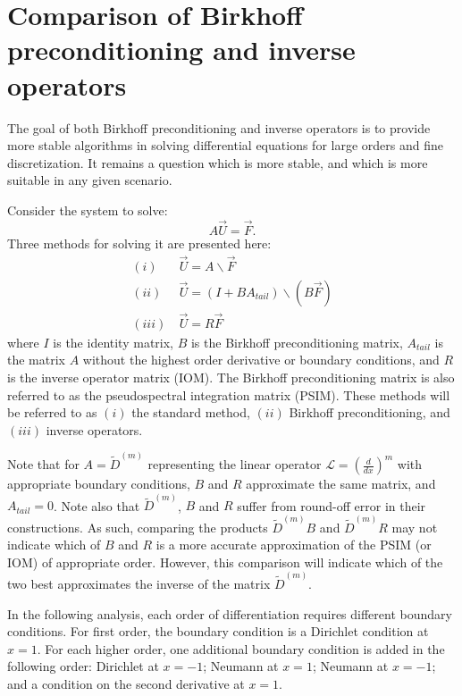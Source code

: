 \documentclass{sfuthesis}
\begin{document}

\chapter{Comparison of Birkhoff preconditioning and inverse operators}
\label{compare}

The goal of both Birkhoff preconditioning and inverse operators is to provide more stable algorithms in solving differential equations for large orders and fine discretization.
It remains a question which is more stable, and which is more suitable in any given scenario.

Consider the system to solve:
\begin{equation}
A \vec{U} = \vec{F}.
\end{equation}
Three methods for solving it are presented here:
\begin{equation}
\begin{aligned}
(i) & \ \vec{U} = A \backslash \vec{F} \\
(ii) & \ \vec{U} = (I + B A_{tail}) \backslash ( B \vec{F} ) \\
(iii) & \ \vec{U} = R \vec{F}
\end{aligned}
\end{equation}
where $I$ is the identity matrix, $B$ is the Birkhoff preconditioning matrix, $A_{tail}$ is the matrix $A$ without the highest order derivative or boundary conditions, and $R$ is the inverse operator matrix (IOM).
The Birkhoff preconditioning matrix is also referred to as the pseudospectral integration matrix (PSIM).
These methods will be referred to as $(i)$ the standard method, $(ii)$ Birkhoff preconditioning, and $(iii)$ inverse operators. 

Note that for $A = \tilde{D}^{(m)}$ representing the linear operator $\mathcal{L} = ( \frac{d}{dx} )^m$ with appropriate boundary conditions, $B$ and $R$ approximate the same matrix, and $A_{tail} = 0$.
Note also that $\tilde{D}^{(m)}$, $B$ and $R$ suffer from round-off error in their constructions.
As such, comparing the products $\tilde{D}^{(m)} B$ and $\tilde{D}^{(m)} R$ may not indicate which of $B$ and $R$ is a more accurate approximation of the PSIM (or IOM) of appropriate order.
However, this comparison will indicate which of the two best approximates the inverse of the matrix $\tilde{D}^{(m)}$.

In the following analysis, each order of differentiation requires different boundary conditions.
For first order, the boundary condition is a Dirichlet condition at $x=1$.
For each higher order, one additional boundary condition is added in the following order:
Dirichlet at $x=-1$; Neumann at $x=1$; Neumann at $x=-1$; and a condition on the second derivative at $x=1$.
\end{document}
